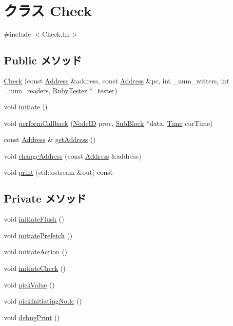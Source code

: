 \hypertarget{classCheck}{
\section{クラス Check}
\label{classCheck}
}


{\ttfamily \#include $<$Check.hh$>$}\subsection*{Public メソッド}
\begin{DoxyCompactItemize}
\item 
\hyperlink{classCheck_ac91bf1af0228e3ff24854600a2791d50}{Check} (const \hyperlink{classAddress}{Address} \&address, const \hyperlink{classAddress}{Address} \&pc, int \_\-num\_\-writers, int \_\-num\_\-readers, \hyperlink{classRubyTester}{RubyTester} $\ast$\_\-tester)
\item 
void \hyperlink{classCheck_ad0188ca8aaba0189f9efa4b14bb7940b}{initiate} ()
\item 
void \hyperlink{classCheck_aafaa6880b81bad24ff0ee650caf91bfc}{performCallback} (\hyperlink{TypeDefines_8hh_a83c14b4ae37e80071f6b3506a6c46151}{NodeID} proc, \hyperlink{classSubBlock}{SubBlock} $\ast$data, \hyperlink{classTime}{Time} curTime)
\item 
const \hyperlink{classAddress}{Address} \& \hyperlink{classCheck_adae095cd74f47f3f24ee267e18e87810}{getAddress} ()
\item 
void \hyperlink{classCheck_a3df4c3e039cf1557a32bd9b7ff9a84e4}{changeAddress} (const \hyperlink{classAddress}{Address} \&address)
\item 
void \hyperlink{classCheck_ac55fe386a101fbae38c716067c9966a0}{print} (std::ostream \&out) const 
\end{DoxyCompactItemize}
\subsection*{Private メソッド}
\begin{DoxyCompactItemize}
\item 
void \hyperlink{classCheck_aab414465afae8e0fde6717473b5e2dde}{initiateFlush} ()
\item 
void \hyperlink{classCheck_aed660435c2bb1a74006597a2816f9287}{initiatePrefetch} ()
\item 
void \hyperlink{classCheck_a1b2221f5b5047c8b42b6bb5407406a9a}{initiateAction} ()
\item 
void \hyperlink{classCheck_a1196917fe04545fcd2dc71127a41d8a6}{initiateCheck} ()
\item 
void \hyperlink{classCheck_a04d2727906355c9e4bdd78cf34436f41}{pickValue} ()
\item 
void \hyperlink{classCheck_ac935b7ff21b8b1f5dc3009785ec29e9b}{pickInitiatingNode} ()
\item 
void \hyperlink{classCheck_a653b559db67502e3171dca8f39cd7783}{debugPrint} ()
\end{DoxyCompactItemize}
